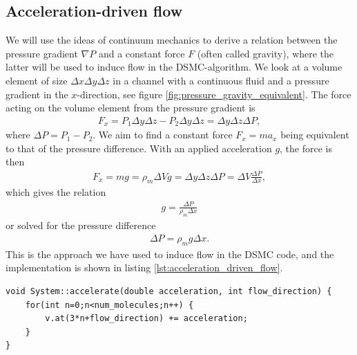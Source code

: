 \subsection{Acceleration-driven flow}
We will use the ideas of continuum mechanics to derive a relation between the pressure gradient $\nabla P$ and a constant force $F$ (often called gravity), where the latter will be used to induce flow in the DSMC-algorithm. We look at a volume element of size $\Delta x\Delta y\Delta z$ in a channel with a continuous fluid and a pressure gradient in the $x$-direction, see figure \ref{fig:pressure_gravity_equivalent}. The force acting on the volume element from the pressure gradient is
\begin{align}
	F_x = P_1\Delta y\Delta z - P_2\Delta y\Delta z = \Delta y\Delta z\Delta P,
\end{align}
where $\Delta P = P_1 - P_2$. We aim to find a constant force $F_x=ma_x$ being equivalent to that of the pressure difference. With an applied acceleration $g$, the force is then
\begin{align}
	F_x = mg = \rho_m \Delta V g = \Delta y\Delta z\Delta P = \Delta V \frac{\Delta P}{\Delta x},
\end{align}
which gives the relation
\begin{align}
	g = \frac{\Delta P}{\rho_m\Delta x}
\end{align}
or solved for the pressure difference
\begin{align}
	\label{eq:acceleration_to_pressure_difference}
	\Delta P = \rho_m g \Delta x.
\end{align}
This is the approach we have used to induce flow in the DSMC code, and the implementation is shown in listing \ref{lst:acceleration_driven_flow}.
\begin{lstlisting}[caption=Acceleration of particles in the DSMC code., label=lst:acceleration_driven_flow]
void System::accelerate(double acceleration, int flow_direction) {
    for(int n=0;n<num_molecules;n++) {
        v.at(3*n+flow_direction) += acceleration;
    }
}
\end{lstlisting}

